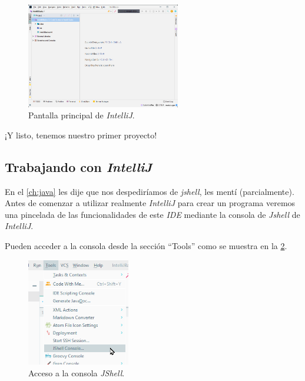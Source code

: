     \begin{figure}[ht!]
      \centering
      \includegraphics[width=0.6\textwidth]{img/Por_algo_se_empieza/idea64_main.png}
      \caption{Pantalla principal de \textit{IntelliJ}.}
      \label{fig:intellij-main}
    \end{figure}

    ¡Y listo, tenemos nuestro primer proyecto!

  \subsection{Trabajando con \textit{IntelliJ}}
    En el \cref{ch:java} les dije que nos despediríamos de \textit{jshell}, les mentí
    (parcialmente).
    Antes de comenzar a utilizar realmente \textit{IntelliJ} para crear un programa veremos una
    pincelada de las funcionalidades de este \textit{IDE} mediante la consola de \textit{Jshell}
    de \textit{IntelliJ}.

    Pueden acceder a la consola desde la sección \enquote{Tools} como se muestra en la 
    \cref{fig:tools-jshell}.

    \begin{figure}[ht!]
      \centering
      \includegraphics[width=0.4\textwidth]{img/Por_algo_se_empieza/idea64_tools_jshell.png}
      \caption{Acceso a la consola \textit{JShell}.}
      \label{fig:tools-jshell}
    \end{figure}

